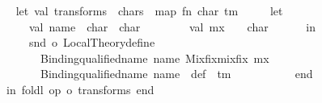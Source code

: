 \begin{isabellebody}
{\isacartoucheclose}\isanewline
\isanewline
{}\isamarkupfalse%
\ {\isacartoucheopen}\isanewline
\ \ let\ val\ transforms\ {\isacharequal}{\kern0pt}\ chars\ {\isacharbar}{\kern0pt}{\isachargreater}{\kern0pt}\ map\ {\isacharparenleft}{\kern0pt}fn\ {\isacharparenleft}{\kern0pt}char{\isacharcomma}{\kern0pt}\ tm{\isacharparenright}{\kern0pt}\ {\isacharequal}{\kern0pt}{\isachargreater}{\kern0pt}\isanewline
\ \ \ \ let\isanewline
\ \ \ \ \ \ val\ name\ {\isacharequal}{\kern0pt}\ {\isachardoublequote}{\kern0pt}char{\isacharprime}{\kern0pt}{\isachardoublequote}{\kern0pt}\ {\isacharcircum}{\kern0pt}\ char\ {\isacharcircum}{\kern0pt}\ {\isachardoublequote}{\kern0pt}{\isacharprime}{\kern0pt}{\isachardoublequote}{\kern0pt}\isanewline
\ \ \ \ \ \ val\ mx\ {\isacharequal}{\kern0pt}\ {\isachardoublequote}{\kern0pt}{\isacharprime}{\kern0pt}{\isacharprime}{\kern0pt}{\isacharprime}{\kern0pt}{\isachardoublequote}{\kern0pt}\ {\isacharcircum}{\kern0pt}\ char\ {\isacharcircum}{\kern0pt}\ {\isachardoublequote}{\kern0pt}{\isacharprime}{\kern0pt}{\isacharprime}{\kern0pt}{\isachardoublequote}{\kern0pt}\isanewline
\ \ \ \ in\isanewline
\ \ \ \ \ \ snd\ o\ Local{\isacharunderscore}{\kern0pt}Theory{\isachardot}{\kern0pt}define\ {\isacharparenleft}{\kern0pt}\isanewline
\ \ \ \ \ \ \ \ {\isacharparenleft}{\kern0pt}Binding{\isachardot}{\kern0pt}qualified{\isacharunderscore}{\kern0pt}name\ name{\isacharcomma}{\kern0pt}\ Mixfix{\isachardot}{\kern0pt}mixfix\ mx{\isacharparenright}{\kern0pt}{\isacharcomma}{\kern0pt}\isanewline
\ \ \ \ \ \ \ \ {\isacharparenleft}{\kern0pt}{\isacharparenleft}{\kern0pt}Binding{\isachardot}{\kern0pt}qualified{\isacharunderscore}{\kern0pt}name\ {\isacharparenleft}{\kern0pt}name\ {\isacharcircum}{\kern0pt}\ {\isachardoublequote}{\kern0pt}{\isacharunderscore}{\kern0pt}def{\isachardoublequote}{\kern0pt}{\isacharparenright}{\kern0pt}{\isacharcomma}{\kern0pt}\ {\isacharbrackleft}{\kern0pt}{\isacharbrackright}{\kern0pt}{\isacharparenright}{\kern0pt}{\isacharcomma}{\kern0pt}\ tm{\isacharparenright}{\kern0pt}\isanewline
\ \ \ \ \ \ {\isacharparenright}{\kern0pt}\isanewline
\ \ \ \ end{\isacharparenright}{\kern0pt}\isanewline
\ \ in\ foldl{}\ {\isacharparenleft}{\kern0pt}op\ o{\isacharparenright}{\kern0pt}\ transforms\ end\isanewline
{\isacartoucheclose}%
\endisatagML
{\isafoldML}%
%
\isadelimML
%
\endisadelimML
%
\isadelimdocument
%
\endisadelimdocument
%
\isatagdocument
%
\isamarkuptrue%
%
\endisatagdocument
{\isafolddocument}%
%
\isadelimdocument
%
\endisadelimdocument
{}\isamarkupfalse%

\end{isabellebody}
